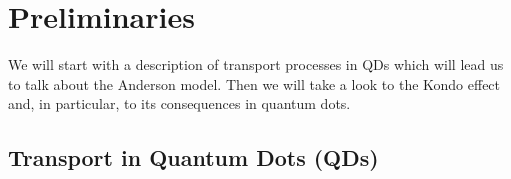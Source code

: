 \chapter{Preliminaries \label{chap:Preliminaries}}


We will start with a  description of transport processes in QDs which will lead us to talk about the Anderson model. Then we will take a look to the Kondo effect and, in particular, to its consequences in quantum dots.  

\section{Transport in Quantum Dots (QDs)}
